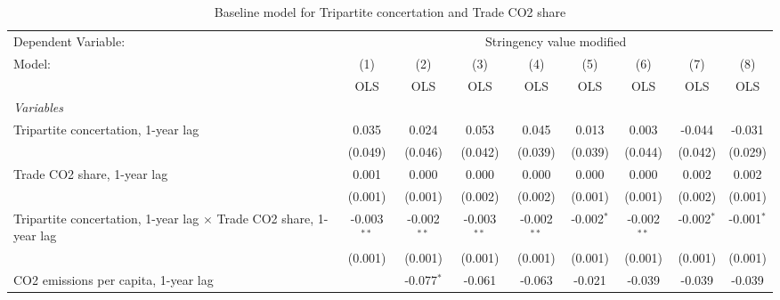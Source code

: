 
\begin{table}[htbp]
   \caption{Baseline model for Tripartite concertation and Trade CO2 share}
   \centering
   \begin{tabular}{lcccccccc}
      \toprule
      Dependent Variable: & \multicolumn{8}{c}{Stringency value modified}\\
      Model:                                                                    & (1)           & (2)           & (3)           & (4)           & (5)           & (6)           & (7)           & (8)\\  
                                                                                &  OLS          & OLS           & OLS           & OLS           & OLS           & OLS           & OLS           & OLS\\  
      \midrule
      \emph{Variables}\\
      Tripartite concertation, 1-year lag                                       & 0.035         & 0.024         & 0.053         & 0.045         & 0.013         & 0.003         & -0.044        & -0.031\\   
                                                                                & (0.049)       & (0.046)       & (0.042)       & (0.039)       & (0.039)       & (0.044)       & (0.042)       & (0.029)\\   
      Trade CO2 share, 1-year lag                                               & 0.001         & 0.000         & 0.000         & 0.000         & 0.000         & 0.000         & 0.002         & 0.002\\   
                                                                                & (0.001)       & (0.001)       & (0.002)       & (0.002)       & (0.001)       & (0.001)       & (0.002)       & (0.001)\\   
      Tripartite concertation, 1-year lag $\times$ Trade CO2 share, 1-year lag  & -0.003$^{**}$ & -0.002$^{**}$ & -0.003$^{**}$ & -0.002$^{**}$ & -0.002$^{*}$  & -0.002$^{**}$ & -0.002$^{*}$  & -0.001$^{*}$\\   
                                                                                & (0.001)       & (0.001)       & (0.001)       & (0.001)       & (0.001)       & (0.001)       & (0.001)       & (0.001)\\   
      CO2 emissions per capita, 1-year lag                                      &               & -0.077$^{*}$  & -0.061        & -0.063        & -0.021        & -0.039        & -0.039        & -0.039\\   

\end{tabular}
\end{table}
